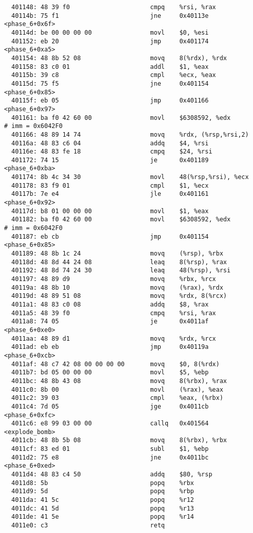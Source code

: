 \documentclass{scrartcl}
\begin{document}
\begin{lstlisting}
  401148: 48 39 f0                      cmpq    %rsi, %rax
  40114b: 75 f1                         jne     0x40113e <phase_6+0x6f>
  40114d: be 00 00 00 00                movl    $0, %esi
  401152: eb 20                         jmp     0x401174 <phase_6+0xa5>
  401154: 48 8b 52 08                   movq    8(%rdx), %rdx
  401158: 83 c0 01                      addl    $1, %eax
  40115b: 39 c8                         cmpl    %ecx, %eax
  40115d: 75 f5                         jne     0x401154 <phase_6+0x85>
  40115f: eb 05                         jmp     0x401166 <phase_6+0x97>
  401161: ba f0 42 60 00                movl    $6308592, %edx          # imm = 0x6042F0
  401166: 48 89 14 74                   movq    %rdx, (%rsp,%rsi,2)
  40116a: 48 83 c6 04                   addq    $4, %rsi
  40116e: 48 83 fe 18                   cmpq    $24, %rsi
  401172: 74 15                         je      0x401189 <phase_6+0xba>
  401174: 8b 4c 34 30                   movl    48(%rsp,%rsi), %ecx
  401178: 83 f9 01                      cmpl    $1, %ecx
  40117b: 7e e4                         jle     0x401161 <phase_6+0x92>
  40117d: b8 01 00 00 00                movl    $1, %eax
  401182: ba f0 42 60 00                movl    $6308592, %edx          # imm = 0x6042F0
  401187: eb cb                         jmp     0x401154 <phase_6+0x85>
  401189: 48 8b 1c 24                   movq    (%rsp), %rbx
  40118d: 48 8d 44 24 08                leaq    8(%rsp), %rax
  401192: 48 8d 74 24 30                leaq    48(%rsp), %rsi
  401197: 48 89 d9                      movq    %rbx, %rcx
  40119a: 48 8b 10                      movq    (%rax), %rdx
  40119d: 48 89 51 08                   movq    %rdx, 8(%rcx)
  4011a1: 48 83 c0 08                   addq    $8, %rax
  4011a5: 48 39 f0                      cmpq    %rsi, %rax
  4011a8: 74 05                         je      0x4011af <phase_6+0xe0>
  4011aa: 48 89 d1                      movq    %rdx, %rcx
  4011ad: eb eb                         jmp     0x40119a <phase_6+0xcb>
  4011af: 48 c7 42 08 00 00 00 00       movq    $0, 8(%rdx)
  4011b7: bd 05 00 00 00                movl    $5, %ebp
  4011bc: 48 8b 43 08                   movq    8(%rbx), %rax
  4011c0: 8b 00                         movl    (%rax), %eax
  4011c2: 39 03                         cmpl    %eax, (%rbx)
  4011c4: 7d 05                         jge     0x4011cb <phase_6+0xfc>
  4011c6: e8 99 03 00 00                callq   0x401564 <explode_bomb>
  4011cb: 48 8b 5b 08                   movq    8(%rbx), %rbx
  4011cf: 83 ed 01                      subl    $1, %ebp
  4011d2: 75 e8                         jne     0x4011bc <phase_6+0xed>
  4011d4: 48 83 c4 50                   addq    $80, %rsp
  4011d8: 5b                            popq    %rbx
  4011d9: 5d                            popq    %rbp
  4011da: 41 5c                         popq    %r12
  4011dc: 41 5d                         popq    %r13
  4011de: 41 5e                         popq    %r14
  4011e0: c3                            retq
\end{lstlisting}
\end{document}
